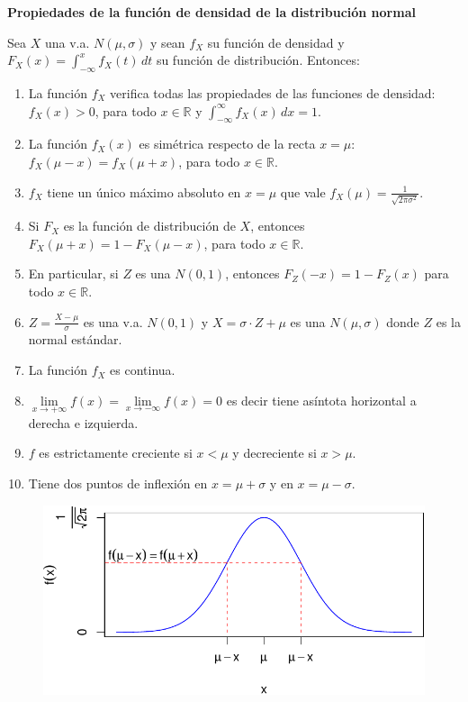 \documentclass[
  letterpaper,
  DIV=11,
  numbers=noendperiod]{scrreprt}
\providecommand{\tightlist}{%
  \setlength{\itemsep}{0pt}\setlength{\parskip}{0pt}}\usepackage{longtable,booktabs,array}
\begin{document}
\textbf{Propiedades de la función de densidad de la distribución normal}

Sea \(X\) una v.a. \(N(\mu,\sigma)\) y sean \(f_{X}\) su función de
densidad y \(F_X(x)=\displaystyle\int_{-\infty}^x f_X(t)\, dt\) su
función de distribución. Entonces:

\begin{enumerate}
\def\labelenumi{\arabic{enumi}.}
\tightlist
\item
  La función \(f_{X}\) verifica todas las propiedades de las funciones
  de densidad: \(f_X(x)>0\), para todo \(x\in\mathbb{R}\) y
  \(\displaystyle\int_{-\infty}^\infty f_X(x)\,dx=1\).
\item
  La función \(f_X(x)\) es simétrica respecto de la recta \(x=\mu\):
  \(f_{X}(\mu-x)=f_{X}(\mu+x)\), para todo \(x\in\mathbb{R}\).
\item
  \(f_{X}\) tiene un único máximo absoluto en \(x=\mu\) que vale
  \(f_X(\mu)=\frac1{\sqrt{2\pi\sigma^2}}\).
\item
  Si \(F_{X}\) es la función de distribución de \(X\), entonces
  \(F_{X}(\mu+x)=1-F_{X}(\mu-x)\), para todo \(x\in\mathbb{R}\).
\item
  En particular, si \(Z\) es una \(N(0,1)\), entonces
  \(F_{Z}(-x)=1-F_{Z}(x)\) para todo \(x\in\mathbb{R}\).
\item
  \(Z=\frac{X-\mu}{\sigma}\) es una v.a. \(N(0,1)\) y
  \(X=\sigma\cdot Z+\mu\) es una \(N(\mu,\sigma)\) donde \(Z\) es la
  normal estándar.
\item
  La función \(f_X\) es continua.
\item
  \(\lim\limits_{x\to+\infty}f(x)=\lim\limits_{x\to-\infty}f(x)=0\) es
  decir tiene asíntota horizontal a derecha e izquierda.
\item
  \(f\) es estrictamente creciente si \(x<\mu\) y decreciente si
  \(x>\mu\).
\item
  Tiene dos puntos de inflexión en \(x=\mu+\sigma\) y en
  \(x=\mu-\sigma\).
\end{enumerate}

\begin{figure}

{\centering \includegraphics{3_files/figure-pdf/unnamed-chunk-77-1.pdf}

}

\end{figure}
\end{document}
